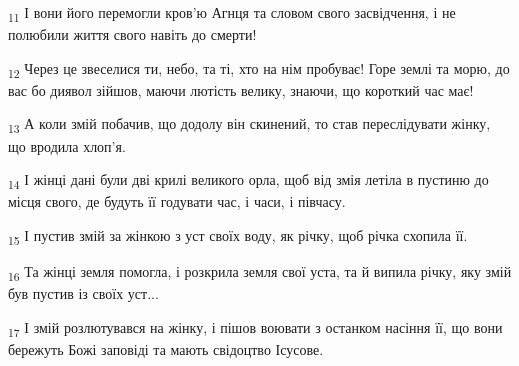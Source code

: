 \begin{tcolorbox}
\textsubscript{11} І вони його перемогли кров'ю Агнця та словом свого засвідчення, і не полюбили життя свого навіть до смерти!
\end{tcolorbox}
\begin{tcolorbox}
\textsubscript{12} Через це звеселися ти, небо, та ті, хто на нім пробуває! Горе землі та морю, до вас бо диявол зійшов, маючи лютість велику, знаючи, що короткий час має!
\end{tcolorbox}
\begin{tcolorbox}
\textsubscript{13} А коли змій побачив, що додолу він скинений, то став переслідувати жінку, що вродила хлоп'я.
\end{tcolorbox}
\begin{tcolorbox}
\textsubscript{14} І жінці дані були дві крилі великого орла, щоб від змія летіла в пустиню до місця свого, де будуть її годувати час, і часи, і півчасу.
\end{tcolorbox}
\begin{tcolorbox}
\textsubscript{15} І пустив змій за жінкою з уст своїх воду, як річку, щоб річка схопила її.
\end{tcolorbox}
\begin{tcolorbox}
\textsubscript{16} Та жінці земля помогла, і розкрила земля свої уста, та й випила річку, яку змій був пустив із своїх уст...
\end{tcolorbox}
\begin{tcolorbox}
\textsubscript{17} І змій розлютувався на жінку, і пішов воювати з останком насіння її, що вони бережуть Божі заповіді та мають свідоцтво Ісусове.
\end{tcolorbox}
